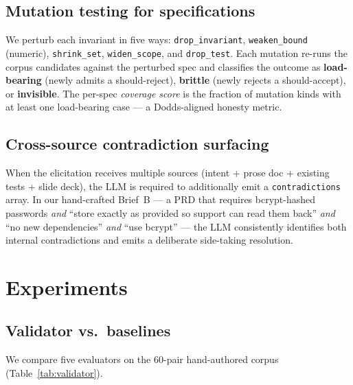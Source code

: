 \documentclass{article}
\begin{document}
\subsection{Mutation testing for specifications}\label{sec:mutation}

We perturb each invariant in five ways: \texttt{drop\_invariant}, \texttt{weaken\_bound} (numeric), \texttt{shrink\_set}, \texttt{widen\_scope}, and \texttt{drop\_test}. Each mutation re-runs the corpus candidates against the perturbed spec and classifies the outcome as \textbf{load-bearing} (newly admits a should-reject), \textbf{brittle} (newly rejects a should-accept), or \textbf{invisible}. The per-spec \emph{coverage score} is the fraction of mutation kinds with at least one load-bearing case --- a Dodds-aligned honesty metric.

\subsection{Cross-source contradiction surfacing}\label{sec:cross}

When the elicitation receives multiple sources (intent + prose doc + existing tests + slide deck), the LLM is required to additionally emit a \texttt{contradictions} array. In our hand-crafted Brief~B --- a PRD that requires bcrypt-hashed passwords \emph{and} ``store exactly as provided so support can read them back'' \emph{and} ``no new dependencies'' \emph{and} ``use bcrypt'' --- the LLM consistently identifies both internal contradictions and emits a deliberate side-taking resolution.

\section{Experiments}\label{sec:datasets}

\subsection{Validator vs.\ baselines}

We compare five evaluators on the 60-pair hand-authored corpus (Table~\ref{tab:validator}).
\end{document}
